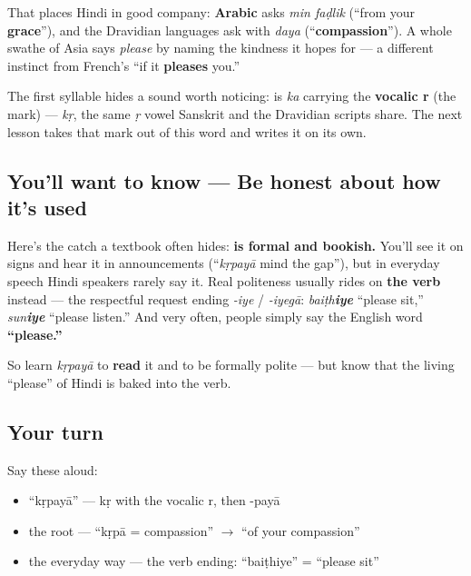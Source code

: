 That places Hindi in good company: \textbf{Arabic} asks \emph{min faḍlik} (\textquotedblleft{}from your \textbf{grace}\textquotedblright{}), and the Dravidian languages ask with \emph{daya} (\textquotedblleft{}\textbf{compassion}\textquotedblright{}). A whole swathe of Asia says \emph{please} by naming the kindness it hopes for — a different instinct from French's \textquotedblleft{}if it \textbf{pleases} you.\textquotedblright{}

The first syllable hides a sound worth noticing: \textbf{} is \emph{ka} carrying the \textbf{vocalic r} (the \emph{} mark) — \emph{kṛ}, the same \emph{ṛ} vowel Sanskrit and the Dravidian scripts share. The next lesson takes that mark out of this word and writes it on its own.

\subsection*{You'll want to know — Be honest about how it's used}
Here's the catch a textbook often hides: \textbf{ is formal and bookish.} You'll see it on signs and hear it in announcements (\textquotedblleft{}\emph{kṛpayā} mind the gap\textquotedblright{}), but in everyday speech Hindi speakers rarely say it. Real politeness usually rides on \textbf{the verb} instead — the respectful request ending \emph{-iye} / \emph{-iyegā}: \emph{baiṭh\textbf{iye}} \textquotedblleft{}please sit,\textquotedblright{} \emph{sun\textbf{iye}} \textquotedblleft{}please listen.\textquotedblright{} And very often, people simply say the English word \textbf{\textquotedblleft{}please.\textquotedblright{}}

So learn \emph{kṛpayā} to \textbf{read} it and to be formally polite — but know that the living \textquotedblleft{}please\textquotedblright{} of Hindi is baked into the verb.

\subsection*{Your turn}
Say these aloud:

\begin{itemize}
\raggedright
  \item \textquotedblleft{}kṛpayā\textquotedblright{} — kṛ with the vocalic r, then -payā
  \item the root — \textquotedblleft{}kṛpā = compassion\textquotedblright{} $\to$ \textquotedblleft{}of your compassion\textquotedblright{}
  \item the everyday way — the verb ending: \textquotedblleft{}baiṭhiye\textquotedblright{} = \textquotedblleft{}please sit\textquotedblright{}
\end{itemize}

